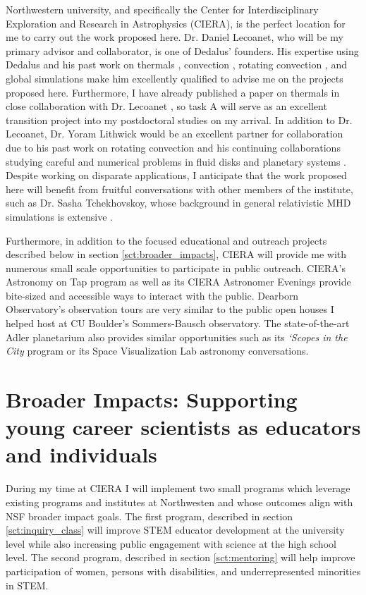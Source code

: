 \documentclass[aasms,11pt, longbibliography]{article}
\makeatletter
\renewcommand{\sectionmark}[1]{%
  \markboth{\ifnum \c@secnumdepth>\z@
      \thesection: \hskip 1em\relax
    \fi #1}{}}
\makeatother
\begin{document}
\label{sct:ciera}
Northwestern university, and specifically the Center for Interdisciplinary Exploration and Research in Astrophysics (CIERA), is the perfect location for me to carry out the work proposed here.
Dr. Daniel Lecoanet, who will be my primary advisor and collaborator, is one of Dedalus' founders.
His expertise using Dedalus and his past work on thermals \citep{lecoanet&jeevanjee2019, tarshis&all2018}, convection \citep{lecoanet&quataert2013, lecoanet&all2014, couston&all2017}, rotating convection \citep{couston&all2019}, and global simulations \citep{lecoanet&all2018} make him excellently qualified to advise me on the projects proposed here.
Furthermore, I have already published a paper on thermals in close collaboration with Dr. Lecoanet \citep{andersLB2019}, so task A will serve as an excellent transition project into my postdoctoral studies on my arrival.
In addition to Dr. Lecoanet, Dr. Yoram Lithwick would be an excellent partner for collaboration due to his past work on rotating convection \citep{BDLithwick2014} and his continuing collaborations studying careful and numerical problems in fluid disks \citep{LDLithwick2019} and planetary systems \citep{hadden&lithwick2018}.
Despite working on disparate applications, I anticipate that the work proposed here will benefit from fruitful conversations with other members of the institute, such as Dr. Sasha Tchekhovskoy, whose background in general relativistic MHD simulations is extensive \citep[as in e.g.,][]{tchekhovskoy&bromberg2016}.

Furthermore, in addition to the focused educational and outreach projects described below in section \ref{sct:broader_impacts}, CIERA will provide me with numerous small scale opportunities to participate in public outreach.
CIERA's Astronomy on Tap program as well as its CIERA Astronomer Evenings provide bite-sized and accessible ways to interact with the public.
Dearborn Observatory's observation tours are very similar to the public open houses I helped host at CU Boulder's Sommers-Bausch observatory.
The state-of-the-art Adler planetarium also provides similar opportunities such as its \emph{`Scopes in the City} program or its Space Visualization Lab astronomy conversations.


\section{Broader Impacts: Supporting young career scientists as educators and individuals}
\sectionmark{Broader Impacts}
\vspace{-6pt}
\label{sct:broader_impacts}
During my time at CIERA I will implement two small programs which leverage existing programs and institutes at Northwesten and whose outcomes align with NSF broader impact goals.
The first program, described in section \ref{sct:inquiry_class} will improve STEM educator development at the university level while also increasing public engagement with science at the high school level.
The second program, described in section \ref{sct:mentoring} will help improve participation of women, persons with disabilities, and underrepresented minorities in STEM.
\end{document}
